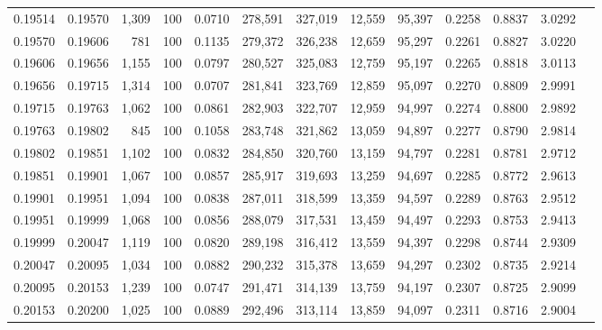 \begin{tabular}{rrrrrrrrrrrrr}
0.19514 & 0.19570 & 1,309 & 100 &                                     0.0710 & 278,591 & 327,019 &  12,559 &  95,397 & 0.2258 & 0.8837 & 3.0292 \\
0.19570 & 0.19606 &   781 & 100 &                                     0.1135 & 279,372 & 326,238 &  12,659 &  95,297 & 0.2261 & 0.8827 & 3.0220 \\
0.19606 & 0.19656 & 1,155 & 100 &                                     0.0797 & 280,527 & 325,083 &  12,759 &  95,197 & 0.2265 & 0.8818 & 3.0113 \\
0.19656 & 0.19715 & 1,314 & 100 &                                     0.0707 & 281,841 & 323,769 &  12,859 &  95,097 & 0.2270 & 0.8809 & 2.9991 \\
0.19715 & 0.19763 & 1,062 & 100 &                                     0.0861 & 282,903 & 322,707 &  12,959 &  94,997 & 0.2274 & 0.8800 & 2.9892 \\
0.19763 & 0.19802 &   845 & 100 &                                     0.1058 & 283,748 & 321,862 &  13,059 &  94,897 & 0.2277 & 0.8790 & 2.9814 \\
0.19802 & 0.19851 & 1,102 & 100 &                                     0.0832 & 284,850 & 320,760 &  13,159 &  94,797 & 0.2281 & 0.8781 & 2.9712 \\
0.19851 & 0.19901 & 1,067 & 100 &                                     0.0857 & 285,917 & 319,693 &  13,259 &  94,697 & 0.2285 & 0.8772 & 2.9613 \\
0.19901 & 0.19951 & 1,094 & 100 &                                     0.0838 & 287,011 & 318,599 &  13,359 &  94,597 & 0.2289 & 0.8763 & 2.9512 \\
0.19951 & 0.19999 & 1,068 & 100 &                                     0.0856 & 288,079 & 317,531 &  13,459 &  94,497 & 0.2293 & 0.8753 & 2.9413 \\
0.19999 & 0.20047 & 1,119 & 100 &                                     0.0820 & 289,198 & 316,412 &  13,559 &  94,397 & 0.2298 & 0.8744 & 2.9309 \\
0.20047 & 0.20095 & 1,034 & 100 &                                     0.0882 & 290,232 & 315,378 &  13,659 &  94,297 & 0.2302 & 0.8735 & 2.9214 \\
0.20095 & 0.20153 & 1,239 & 100 &                                     0.0747 & 291,471 & 314,139 &  13,759 &  94,197 & 0.2307 & 0.8725 & 2.9099 \\
0.20153 & 0.20200 & 1,025 & 100 &                                     0.0889 & 292,496 & 313,114 &  13,859 &  94,097 & 0.2311 & 0.8716 & 2.9004 \\

\end{tabular}
